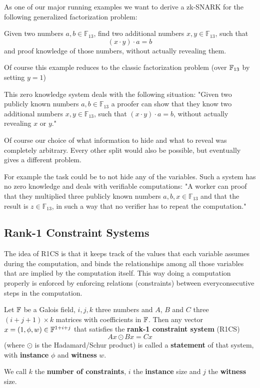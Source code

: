 \begin{example}
\label{main_example_2_1}
As one of our major running examples we want to derive a zk-SNARK for the following generalized factorization problem: 

Given two numbers $a,b\in \mathbb{F}_{13}$, find two additional numbers $x,y\in \mathbb{F}_{13}$, such that
$$
(x\cdot y) \cdot a = b 
$$
and proof knowledge of those numbers, without actually revealing them.

Of course this example reduces to the classic factorization problem (over $\mathbb{F}_{13}$ by setting $y=1$)

This zero knowledge system deals with the following situation: "Given two publicly known numbers $a,b \in \mathbb{F}_{13}$ a proofer can show that they know two additional numbers $x,y\in \mathbb{F}_{13}$, such that $(x\cdot y) \cdot a = b$, without actually revealing $x$ or $y$." 

Of course our choice of what information to hide and what to reveal was completely arbitrary. Every other split would also be possible, but eventually gives a different problem. 

For example the task could be to not hide any of the variables.  Such 
a system has no zero knowledge and deals with verifiable computations: "A worker can proof that they multiplied three publicly known numbers $a,b,x \in \mathbb{F}_{13}$ and that the result is $z \in \mathbb{F}_{13}$, in such a way that no verifier has to repeat the computation."
\end{example}


\subsection{Rank-1 Constraint Systems}
The idea of R1CS is that it keeps track of the values that each variable assumes during the computation, and binds the relationships among all those variables that are implied by the computation itself. This way doing a computation properly is enforced by enforcing relations (constraints) between everyconsecutive steps in the computation.


\begin{definition}
Let $\mathbb{F}$ be a Galois field, $i,j,k$ three numbers and $A$, $B$ and $C$ three $(i+j+1) \times k$ matrices with coefficients in $\mathbb{F}$. Then any vector $x= (1,\phi,w)\in \mathbb{F}^{1+i+j}$ that satisfies the \textbf{rank-1 constraint system} (R1CS)
$$
Ax \odot Bx = Cx
$$
(where $\odot$ is the Hadamard/Schur product) is called a \textbf{statement} of that system, with \textbf{instance} $\phi$ and \textbf{witness} $w$.

We call $k$ the \textbf{number of constraints}, $i$ the \textbf{instance} size and $j$ the \textbf{witness} size.
\end{definition}

